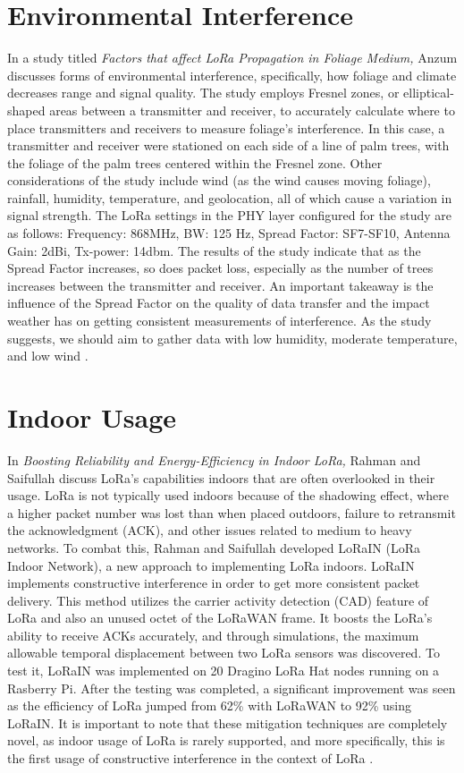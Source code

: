 \documentclass[sigsmall]{acmart}
\begin{document}
\section*{Environmental Interference}
In a study titled \textit{Factors that affect LoRa Propagation in Foliage Medium,} Anzum discusses forms of environmental interference, specifically, how foliage and climate decreases range and signal quality. The study employs Fresnel zones, or elliptical-shaped areas between a transmitter and receiver, to accurately calculate where to place transmitters and receivers to measure foliage's interference. In this case, a transmitter and receiver were stationed on each side of a line of palm trees, with the foliage of the palm trees centered within the Fresnel zone. Other considerations of the study include wind (as the wind causes moving foliage), rainfall, humidity, temperature, and geolocation, all of which cause a variation in signal strength. The LoRa settings in the PHY layer configured for the study are as follows: Frequency: 868MHz, BW: 125 Hz, Spread Factor: SF7-SF10, Antenna Gain: 2dBi, Tx-power: 14dbm. The results of the study indicate that as the Spread Factor increases, so does packet loss, especially as the number of trees increases between the transmitter and receiver. An important takeaway is the influence of the Spread Factor on the quality of data transfer and the impact weather has on getting consistent measurements of interference. As the study suggests, we should aim to gather data with low humidity, moderate temperature, and low wind \cite{anzum2021factors}. 

\section*{Indoor Usage}
In \textit{Boosting Reliability and Energy-Efficiency in Indoor LoRa,} Rahman and Saifullah discuss LoRa's capabilities indoors that are often overlooked in their usage. LoRa is not typically used indoors because of the shadowing effect, where a higher packet number was lost than when placed outdoors, failure to retransmit the acknowledgment (ACK), and other issues related to medium to heavy networks. To combat this, Rahman and Saifullah developed LoRaIN (LoRa Indoor Network), a new approach to implementing LoRa indoors. LoRaIN implements constructive interference in order to get more consistent packet delivery. This method utilizes the carrier activity detection (CAD) feature of LoRa and also an unused octet of the LoRaWAN frame. It boosts the LoRa's ability to receive ACKs accurately, and through simulations, the maximum allowable temporal displacement between two LoRa sensors was discovered. To test it, LoRaIN was implemented on 20 Dragino LoRa Hat nodes running on a Rasberry Pi. After the testing was completed, a significant improvement was seen as the efficiency of LoRa jumped from 62\% with LoRaWAN to 92\% using LoRaIN. It is important to note that these mitigation techniques are completely novel, as indoor usage of LoRa is rarely supported, and more specifically, this is the first usage of constructive interference in the context of LoRa \cite{10.1145/3576842.3582327}. 
\end{document}
